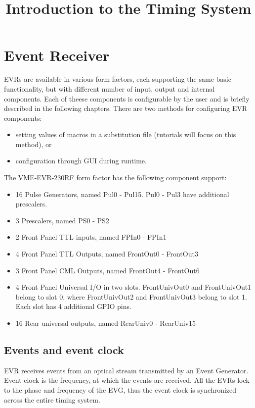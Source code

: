 \documentclass[12pt,a4paper]{article}
\title{Introduction to the Timing System}
\begin{document}
\maketitle


\tableofcontents

\section{Event Receiver}
EVRs are available in various form factors, each supporting the same basic functionality, but with different number of input, output and internal components. Each of theese components is configurable by the user and is briefly described in the following chapters. There are two methods for configuring EVR components:
\begin{itemize}
  \item setting values of macros in a substitution file (tutorials will focus on this method), or
  \item configuration through GUI during runtime.
\end{itemize}
The VME-EVR-230RF form factor has the following component support:
\begin{itemize}
  \item 16 Pulse Generators, named Pul0 - Pul15. Pul0 - Pul3 have additional prescalers.
  \item 3 Prescalers, named PS0 - PS2
  \item 2 Front Panel TTL inputs, named FPIn0 - FPIn1
  \item 4 Front Panel TTL Outputs, named FrontOut0 - FrontOut3
  \item 3 Front Panel CML Outputs, named FrontOut4 - FrontOut6
  \item 4 Front Panel Universal I/O in two slots. FrontUnivOut0 and FrontUnivOut1 belong to slot 0, where FrontUnivOut2 and FrontUnivOut3 belong to slot 1. Each slot has 4 additional GPIO pins.
  \item 16 Rear universal outputs, named RearUniv0 - RearUniv15
\end{itemize}

\subsection{Events and event clock}
EVR receives events from an optical stream transmitted by an Event Generator. Event clock is the frequency, at which the events are received. All the EVRs lock to the phase and frequency of the EVG, thus the event clock is synchronized across the entire timing system.
\end{document}
